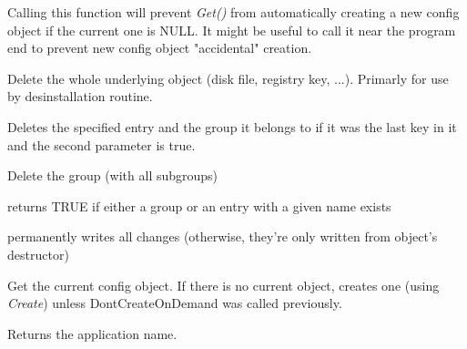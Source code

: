 
Calling this function will prevent {\it Get()} from automatically creating a
new config object if the current one is NULL. It might be useful to call it
near the program end to prevent new config object "accidental" creation.

\label{wxconfigbasedeleteall}


Delete the whole underlying object (disk file, registry key, ...). Primarly
for use by desinstallation routine.

\label{wxconfigbasedeleteentry}


Deletes the specified entry and the group it belongs to if
it was the last key in it and the second parameter is true.

\label{wxconfigbasedeletegroup}


Delete the group (with all subgroups)

\label{wxconfigbaseexists}


returns TRUE if either a group or an entry with a given name exists

\label{wxconfigbaseflush}


permanently writes all changes (otherwise, they're only written from object's
destructor)

\label{wxconfigbaseget}


Get the current config object. If there is no current object, creates one
(using {\it Create}) unless DontCreateOnDemand was called previously.

\label{wxconfigbasegetappname}


Returns the application name.

